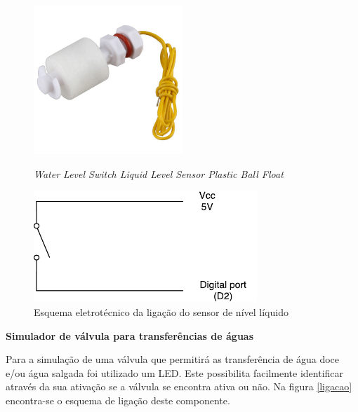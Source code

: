\begin{figure}[h]
	\centering
	\begin{minipage}[b]{0.49\textwidth}
		\centering
		\includegraphics[width=0.5\textwidth]{img/hardware/liquido.JPG}
		\caption{\textit{Water Level Switch Liquid Level Sensor Plastic Ball Float}}
		\label{levelimg}
	\end{minipage}
	\hfill
	\begin{minipage}[b]{0.49\textwidth}
		\centering
		\includegraphics[width=0.75\textwidth]{img/hardware/sw_esquema.pdf}
		\caption{Esquema eletrotécnico da ligação do sensor de nível líquido}
		\label{esquem-liquido}
	\end{minipage}
\end{figure}



\textbf{Simulador de válvula para transferências de águas}

Para a simulação de uma válvula que permitirá as transferência de água doce e/ou água salgada foi utilizado um \ac{LED}. Este possibilita facilmente identificar através da sua ativação se a válvula se encontra ativa ou não. Na figura \ref{ligacao} encontra-se o esquema de ligação deste componente. 


